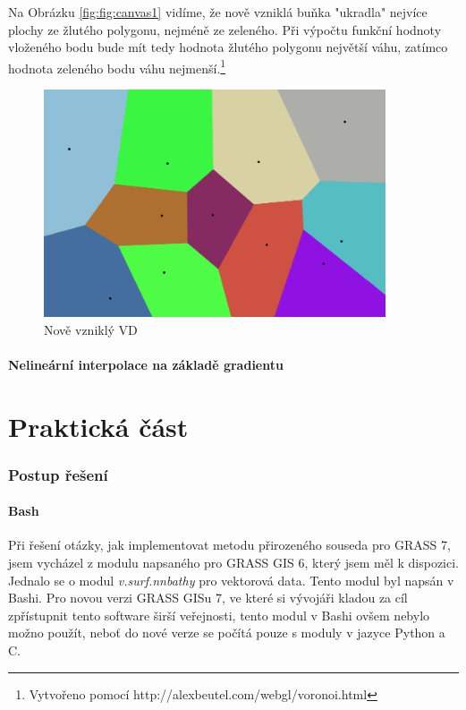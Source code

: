 \documentclass[12pt,a4paper]{article}
\begin{document}
\newpage
Na Obrázku \ref{fig:fig:canvas1} vidíme, že nově vzniklá buňka "ukradla" nejvíce plochy ze žlutého polygonu, nejméně ze zeleného. Při výpočtu funkční hodnoty vloženého bodu bude mít tedy hodnota žlutého polygonu největší váhu, zatímco hodnota zeleného bodu váhu nejmenší.\footnote{Vytvořeno pomocí http://alexbeutel.com/webgl/voronoi.html}
\begin{figure}[h!]
\centering
\includegraphics[width=0.9\textwidth]{img/canvas_2.png}
\caption{Nově vzniklý VD}
\label{fig:fig:canvas2}
\end{figure}

\subsection{Nelineární interpolace na základě gradientu}

\newpage	
\part{Praktická část}

\newpage
\section{Postup řešení}
\subsection{Bash}
Při řešení otázky, jak implementovat metodu přirozeného souseda pro GRASS 7, jsem vycházel z modulu napsaného pro GRASS GIS 6, který jsem měl k dispozici. Jednalo se o modul \emph{v.surf.nnbathy} pro vektorová data. Tento modul byl napsán v Bashi. Pro novou verzi GRASS GISu 7, ve které si vývojáři kladou za cíl zpřístupnit tento software širší veřejnosti, tento modul v Bashi ovšem nebylo možno použít, neboť do nové verze se počítá pouze s moduly v jazyce Python a C.
\end{document}
